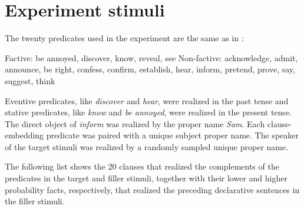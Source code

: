\documentclass[11pt,fleqn]{article}
\newcommand{\6}{\mbox{$[\hspace*{-.6mm}[$}}
\newcommand{\9}{\mbox{$]\hspace*{-.6mm}]$}}
\begin{document}
\section{Experiment stimuli}\label{a:clauses}

The twenty predicates used in the experiment are the same as in \citealt{degen-tonhauser-openmind,degen-tonhauser-language}:

\begin{exe}
\ex\label{predicates}
\begin{xlist}
\ex Factive: be annoyed, discover, know, reveal, see
\ex Non-factive: acknowledge, admit, announce, be right, confess, confirm, establish, hear, inform, pretend, prove, say, suggest, think
\end{xlist}
\end{exe}

Eventive predicates, like {\em discover} and {\em hear}, were realized in the past tense and stative predicates, like {\em know} and {\em be annoyed}, were realized in the present tense. The direct object of {\em inform} was realized by the proper name {\em Sam}. Each clause-embedding predicate was paired with a unique subject proper name. The speaker of the target stimuli was realized by a randomly sampled unique proper name. 

The following list shows the 20 clauses that realized the complements of the predicates in the target and filler stimuli, together with their lower and higher probability facts, respectively, that realized the preceding declarative sentences in the filler stimuli.
\end{document}
